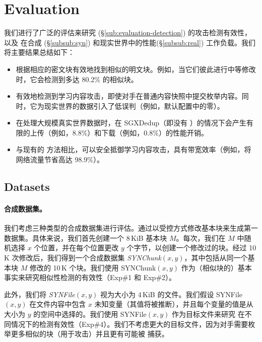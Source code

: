 \section{Evaluation}
\label{sec:evaluation}


我们进行了广泛的评估来研究 \sysnameF (\S\ref{sub:evaluation-detection}) 的攻击检测有效性，以及 \prototype 在合成 (\S\ref{subsub:syn}) 和现实世界中的性能(\S\ref{subsub:real}) 工作负载。我们将主要结果总结如下：
\begin{itemize}[leftmargin=*]
\item \sysnameF 根据相应的密文块有效地找到相似的明文块。例如，当它们彼此进行中等修改时，它会检测到多达 80.2\% 的相似块。
\item \sysnameF 有效地检测到学习内容攻击，即使对手在普通内容快照中提交枚举内容。同时，它为现实世界的数据引入了低误判（例如，默认配置中的零）。
\item \prototype 在处理大规模真实世界数据时，在 SGXDedup（即没有 \sysnameF）的情况下会产生有限的上传（例如，8.8\%）和下载（例如，0.8\%）的性能开销。
\item 与现有的 \cite{harnik10, li15} 方法相比，可以安全抵御学习内容攻击，\prototype 具有带宽效率（例如，将网络流量节省高达 98.9\%）。
\end{itemize}


\subsection{Datasets}
\label{sub:datasets}

\paragraph{合成数据集。}

我们考虑三种类型的合成数据集进行评估。通过以受控方式修改基本块来生成第一数据集。具体来说，我们首先创建一个 8\,KiB 基本块 $M$。每次，我们在 $M$ 中随机选择 $x$ 个位置，并在每个位置更改 $y$ 个字节，以创建一个修改过的块。经过 10\,K 次修改后，我们得到一个合成数据集 {\em SYNChunk}$(x, y)$，其中包括从同一个基本块 $M$ 修改的 10\,K 个块。我们使用 SYNChunk$(x, y)$ 作为（相似块的）基本事实来研究相似性检测的有效性（Exp\#1 和 Exp\#2）。

此外，我们将 {\em SYNFile}$(x, y)$ 视为大小为 4\,KiB 的文件。我们假设 SYNFile$(x, y)$ 在文件内容中包含 $x$ 未知变量（其值将被推断），并且每个变量的值是从大小为 $y$ 的空间中选择的。我们使用 SYNFile$(x, y)$ 作为目标文件来研究 \sysnameF 在不同情况下的检测有效性（Exp\#4）。我们不考虑更大的目标文件，因为对手需要枚举更多相似的块（用于攻击）并且更有可能被 \sysnameF 捕获。

